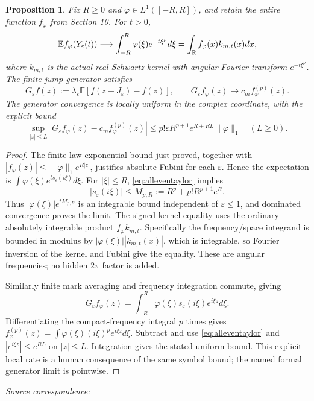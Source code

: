 \documentclass[11pt]{article}
\newtheorem{proposition}[theorem]{Proposition}
\newcommand{\E}{\mathbb E}\newcommand{\Pp}{\mathbb P}
\begin{document}
\begin{proposition}\label{prop:allevenband}
Fix $R\geq0$ and $\varphi\in L^1([-R,R])$, and retain the entire
function $f_\varphi$ from Section 10. For $t>0$,
\[
 \E f_\varphi(Y_\varepsilon(t))\longrightarrow
 \int_{-R}^R\varphi(\xi)e^{-t\xi^p}d\xi
       =\int_\R f_\varphi(x)k_{m,t}(x)dx,
\]
where $k_{m,t}$ is the actual real Schwartz kernel with angular
Fourier transform $e^{-t\xi^p}$. The finite jump generator satisfies
\[
 G_\varepsilon f(z):=\lambda_\varepsilon
             \E[f(z+J_\varepsilon)-f(z)],\qquad
 G_\varepsilon f_\varphi(z)\longrightarrow
                       c_m f_\varphi^{(p)}(z).
\]
The generator convergence is locally uniform in the complex
coordinate, with the explicit bound
\[
 \sup_{|z|\leq L}|G_\varepsilon f_\varphi(z)
                  -c_m f_\varphi^{(p)}(z)|
 \leq p!\varepsilon R^{p+1}e^{R+RL}\|\varphi\|_1
 \quad(L\geq0).
\]
\end{proposition}
\begin{proof}
The finite-law exponential bound just proved, together with
$|f_\varphi(z)|\leq\|\varphi\|_1e^{R|z|}$, justifies absolute
Fubini for each $\varepsilon$. Hence the expectation is
$\int\varphi(\xi)e^{t s_\varepsilon(i\xi)}d\xi$.
For $|\xi|\leq R$, \eqref{eq:alleventaylor} implies
\[
 |s_\varepsilon(i\xi)|\leq M_{p,R}:=
                  R^p+p!R^{p+1}e^R.
\]
Thus $|\varphi(\xi)|e^{tM_{p,R}}$ is an integrable bound independent
of $\varepsilon\leq1$, and dominated convergence proves the limit.
The signed-kernel equality uses the ordinary absolutely integrable
product $f_\varphi k_{m,t}$. Specifically the frequency/space
integrand is bounded in modulus by
$|\varphi(\xi)||k_{m,t}(x)|$, which is integrable, so Fourier
inversion of the kernel and Fubini give the equality. These are
angular frequencies; no hidden $2\pi$ factor is added.

Similarly finite mark averaging and frequency integration commute,
giving
\[
 G_\varepsilon f_\varphi(z)=\int_{-R}^R
   \varphi(\xi)s_\varepsilon(i\xi)e^{i\xi z}d\xi.
\]
Differentiating the compact-frequency integral $p$ times gives
$f_\varphi^{(p)}(z)=\int\varphi(\xi)(i\xi)^pe^{i\xi z}d\xi$.
Subtract and use \eqref{eq:alleventaylor} and
$|e^{i\xi z}|\leq e^{R L}$ on $|z|\leq L$. Integration gives the
stated uniform bound. This explicit local rate is a human
consequence of the same symbol bound; the named formal generator
limit is pointwise.
\end{proof}
\par\smallskip\begingroup\small\raggedright
\noindent\textit{Source correspondence:}
\end{document}
